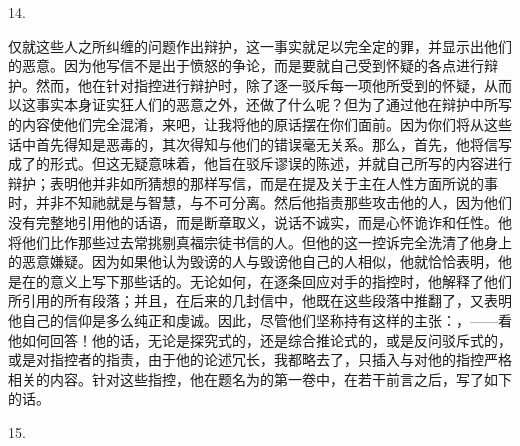 14. \par

仅就这些人之所纠缠的问题作出辩护，这一事实就足以完全定的罪，并显示出他们的恶意。因为他写信不是出于愤怒的争论，而是要就自己受到怀疑的各点进行辩护。然而，他在针对指控进行辩护时，除了逐一驳斥每一项他所受到的怀疑，从而以这事实本身证实狂人们的恶意之外，还做了什么呢？但为了通过他在辩护中所写的内容使他们完全混淆，来吧，让我将他的原话摆在你们面前。因为你们将从这些话中首先得知是恶毒的，其次得知与他们的错误毫无关系。那么，首先，他将信写成了的形式。但这无疑意味着，他旨在驳斥谬误的陈述，并就自己所写的内容进行辩护；表明他并非如所猜想的那样写信，而是在提及关于主在人性方面所说的事时，并非不知祂就是与智慧，与不可分离。然后他指责那些攻击他的人，因为他们没有完整地引用他的话语，而是断章取义，说话不诚实，而是心怀诡诈和任性。他将他们比作那些过去常挑剔真福宗徒书信的人。但他的这一控诉完全洗清了他身上的恶意嫌疑。因为如果他认为毁谤的人与毁谤他自己的人相似，他就恰恰表明，他是在的意义上写下那些话的。无论如何，在逐条回应对手的指控时，他解释了他们所引用的所有段落；并且，在后来的几封信中，他既在这些段落中推翻了，又表明他自己的信仰是多么纯正和虔诚。因此，尽管他们坚称持有这样的主张：，——看他如何回答！他的话，无论是探究式的，还是综合推论式的，或是反问驳斥式的，或是对指控者的指责，由于他的论述冗长，我都略去了，只插入与对他的指控严格相关的内容。针对这些指控，他在题名为的第一卷中，在若干前言之后，写了如下的话。\par

15. \par

